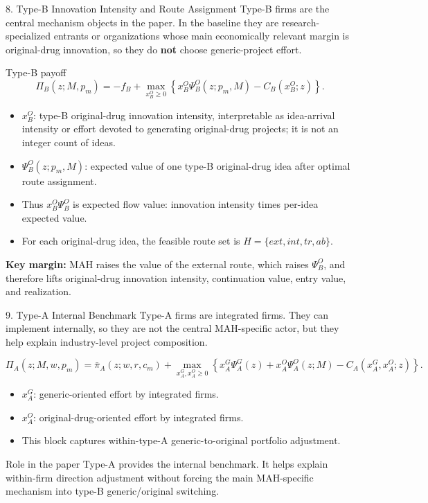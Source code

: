 \documentclass[aspectratio=169,11pt]{beamer}
\begin{document}
\begin{frame}{8. Type-B Innovation Intensity and Route Assignment}
\small
Type-B firms are the central mechanism objects in the paper. In the baseline they are
research-specialized entrants or organizations whose main economically relevant margin is original-drug innovation, so they do \textbf{not} choose generic-project effort.

\vspace{0.1cm}
\begin{block}{Type-B payoff}
\[
\Pi_B(z;M,p_m)= -f_B+
\max_{x_B^O\ge 0}
\left\{x_B^O\Psi_B^O(z;p_m,M)-C_B(x_B^O;z)\right\}.
\]
\end{block}

\begin{itemize}
\item \(x_B^O\): type-B original-drug innovation intensity, interpretable as idea-arrival intensity or effort devoted to generating original-drug projects; it is not an integer count of ideas.
\item \(\Psi_B^O(z;p_m,M)\): expected value of one type-B original-drug idea after optimal route assignment.
\item Thus \(x_B^O\Psi_B^O\) is expected flow value: innovation intensity times per-idea expected value.
\item For each original-drug idea, the feasible route set is \(H=\{ext,int,tr,ab\}\).
\end{itemize}

\textbf{Key margin:} MAH raises the value of the external route, which raises \(\Psi_B^O\), and therefore lifts original-drug innovation intensity, continuation value, entry value, and realization.
\end{frame}

\begin{frame}{9. Type-A Internal Benchmark}
\small
Type-A firms are integrated firms. They can implement internally, so they are not the central
MAH-specific actor, but they help explain industry-level project composition.

\vspace{0.1cm}
\[
\Pi_A(z;M,w,p_m)=\bar\pi_A(z;w,r,c_m)+
\max_{x_A^G,x_A^O\ge 0}
\left\{x_A^G\Psi_A^G(z)+x_A^O\Psi_A^O(z;M)-C_A(x_A^G,x_A^O;z)\right\}.
\]

\begin{itemize}
\item \(x_A^G\): generic-oriented effort by integrated firms.
\item \(x_A^O\): original-drug-oriented effort by integrated firms.
\item This block captures within-type-A generic-to-original portfolio adjustment.
\end{itemize}

\begin{block}{Role in the paper}
Type-A provides the internal benchmark. It helps explain within-firm direction adjustment without forcing the main MAH-specific mechanism into type-B generic/original switching.
\end{block}
\end{frame}
\end{document}
